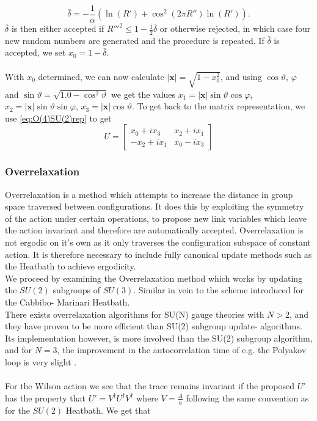 \documentclass[a4paper,10pt]{article}
\begin{document}
\begin{equation}
\bar{\delta} = -\frac{1}{\alpha}\left(\ln \left(R'\right)+\cos ^{2}\left(2 \pi R''\right) \ln \left(R'\right)\right).
\end{equation}
$\bar{\delta}$ is then either accepted if 
$R'''^2 \leq 1-\frac{1}{2}\bar{\delta}$ or otherwise rejected, in which case four new random numbers are generated and the procedure is repeated. If $\bar{\delta}$ is accepted, we set $x_0 = 1-\bar{\delta}$.\\\\With $x_0$ determined, we can now calculate $|\mathbf{x}| = \sqrt{1-x_0^2}$, and using $\cos \vartheta$, $\varphi$ and $\sin \vartheta = \sqrt{1.0-\cos^2 \vartheta}$ we get the values $x_1 = |\mathbf{x}|\sin \vartheta \cos\varphi$, $x_2 = |\mathbf{x}|\sin \vartheta \sin\varphi$, $x_3 = |\mathbf{x}|\cos \vartheta$. To get back to the matrix representation, we use \eqref{eq:O(4)SU(2)rep} to get
\begin{equation}
U=\left[\begin{array}{ll}
x_0+ix_3 & x_2+ix_1 \\
-x_2+ix_1 & x_0-ix_3
\end{array}\right]
\end{equation}
\subsubsection{Overrelaxation}
Overrelaxation is a method which attempts to increase the distance in group space traversed between configurations. It does this by exploiting the symmetry of the action under certain operations, to propose new link variables which leave the action invariant and therefore are automatically accepted.
Overrelaxation is not ergodic on it's own as it only traverses the configuration subspace of constant action. It is therefore necessary to include fully canonical update methods such as the Heatbath to achieve ergodicity.\\We proceed by examining the Overrelaxation method which works by updating the $SU(2)$ subgroups of $SU(3)$. Similar in vein to the scheme introduced for the Cabbibo- Marinari Heatbath.\\There exists overrelaxation algorithms for SU(N) gauge theories with $N>2$, and they have proven to be more efficient than SU(2) subgroup update- algorithms. Its implementation however, is more involved than the SU(2) subgroup algorithm, and for $N=3$, the improvement in the autocorrelation time of e.g. the Polyakov loop is very slight \cite{inbook}.\\\\For the Wilson action we see that the trace remains invariant if the proposed $U'$ has the property that $U' = V^\dagger U^\dagger V^\dagger$ where $V = \frac{A}{a}$ following the same convention as for the $SU(2)$ Heatbath. We get that
\end{document}
